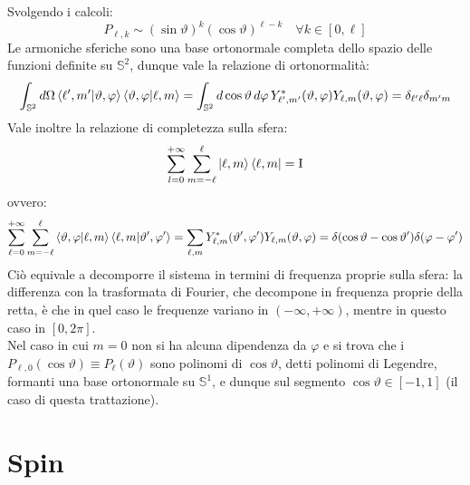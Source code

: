 Svolgendo i calcoli:
\begin{equation}
	P_{\ell,k} \sim \left( \sin \vartheta \right)^k \left( \cos \vartheta \right)^{\ell-k} \quad \forall k \in \left[ 0,\ell \right]
	\label{eq:2.33}
\end{equation}
Le armoniche sferiche sono una base ortonormale completa dello spazio delle funzioni definite su $ \mathbb{S}^2 $, dunque vale la relazione di ortonormalità:
\begin{equation}
	\int_{\mathbb{S}^2} d\Omega \braket{\ell',m' | \vartheta,\varphi}\braket{\vartheta,\varphi | \ell,m} = \int_{\mathbb{S}^2} d\cos\vartheta \,d\varphi \, Y^*_{\ell',m'}(\vartheta,\varphi) Y_{\ell,m}(\vartheta,\varphi) = \delta_{\ell'\ell} \delta_{m'm}
	\label{eq:2.34}
\end{equation}
Vale inoltre la relazione di completezza sulla sfera:
\begin{equation}
	\sum_{l = 0}^{+\infty} \sum_{m = -\ell}^{\ell} \ket{\ell,m}\bra{\ell,m} = \mathrm{I}
	\label{eq:2.35}
\end{equation}
ovvero:
\begin{equation}
	\sum_{\ell = 0}^{+\infty} \sum_{m = -\ell}^{\ell} \braket{\vartheta,\varphi | \ell,m}\braket{\ell,m | \vartheta',\varphi'} = \sum_{\ell,m} Y^*_{\ell,m}(\vartheta',\varphi')Y_{\ell,m}(\vartheta,\varphi) = \delta(\cos \vartheta - \cos \vartheta') \delta(\varphi - \varphi')
	\label{eq:2.36}
\end{equation}
Ciò equivale a decomporre il sistema in termini di frequenza proprie sulla sfera: la differenza con la trasformata di Fourier, che decompone in frequenza proprie della retta, è che in quel caso le frequenze variano in $ \left( -\infty,+\infty \right) $, mentre in questo caso in $ \left[ 0,2\pi \right] $.\\
Nel caso in cui $ m = 0 $ non si ha alcuna dipendenza da $ \varphi $ e si trova che i $ P_{\ell,0}(\cos \vartheta) \equiv P_{\ell}(\vartheta) $ sono polinomi di $ \cos \vartheta $, detti polinomi di Legendre, formanti una base ortonormale su $ \mathbb{S}^1 $, e dunque sul segmento $ \cos \vartheta \in \left[ -1,1 \right] $ (il caso di questa trattazione).

\section{Spin}

